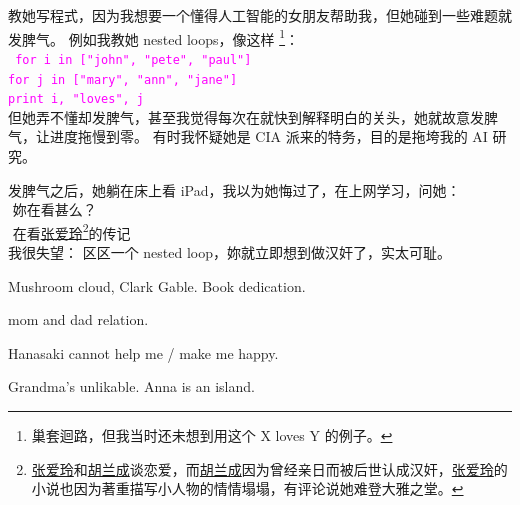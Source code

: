\documentclass[12pt]{report}
\newcommand{\code}[1]{\texttt{\textcolor{Magenta}{\small{#1}}}}
\newcommand{\tab}{\hspace*{1cm}}
\newcommand*\dashh{\textemdash\,\,}
\begin{document}
教她写程式，因为我想要一个懂得人工智能的女朋友帮助我，但她碰到一些难题就发脾气。 例如我教她 nested loops，像这样 \footnote{巢套迴路，但我当时还未想到用这个 X loves Y 的例子。}：\\
\code{
\tab for i in ["john", "pete", "paul"] \\
\tab \tab for j in ["mary", "ann", "jane"] \\
\tab \tab \tab print i, "loves", j } \\
但她弄不懂却发脾气，甚至我觉得每次在就快到解释明白的关头，她就故意发脾气，让进度拖慢到零。 有时我怀疑她是 CIA 派来的特务，目的是拖垮我的 AI 研究。

发脾气之后，她躺在床上看 iPad，我以为她悔过了，在上网学习，问她：\\
\tab \dashh 妳在看甚么？ \\
\tab \dashh 在看\underline{张爱玲}\footnote{\underline{张爱玲}和\underline{胡兰成}谈恋爱，而\underline{胡兰成}因为曾经亲日而被后世认成汉奸，\underline{张爱玲}的小说也因为著重描写小人物的情情塌塌，有评论说她难登大雅之堂。}的传记 \\
我很失望： 区区一个 nested loop，妳就立即想到做汉奸了，实太可耻。

Mushroom cloud, Clark Gable.  Book dedication.

mom and dad relation.

Hanasaki cannot help me / make me happy.

Grandma's unlikable.  Anna is an island.

\end{document}
